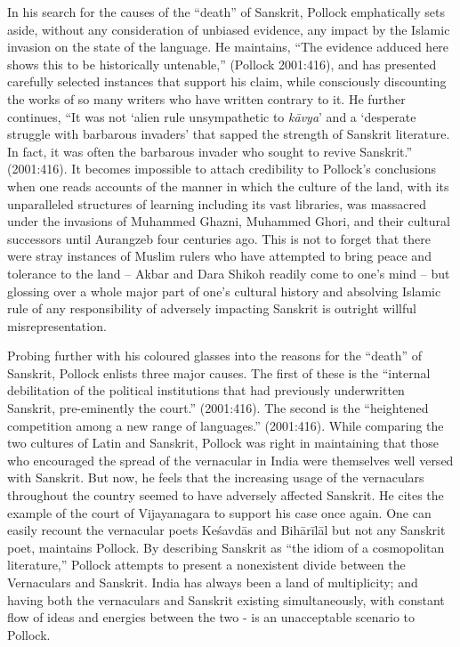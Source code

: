 In his search for the causes of the “death” of Sanskrit, Pollock emphatically sets aside, without any consideration of unbiased evidence, any impact by the Islamic invasion on the state of the language. He maintains, “The evidence adduced here shows this to be historically untenable,” (Pollock 2001:416), and has presented carefully selected instances that support his claim, while consciously discounting the works of so many writers who have written contrary to it. He further continues, “It was not ‘alien rule unsympathetic to {\sl kāvya}’ and a ‘desperate struggle with barbarous invaders’ that sapped the strength of Sanskrit literature. In fact, it was often the barbarous invader who sought to revive Sanskrit.” (2001:416). It becomes impossible to attach credibility to Pollock’s conclusions when one reads accounts of the manner in which the culture of the land, with its unparalleled structures of learning including its vast libraries, was massacred under the invasions of Muhammed Ghazni, Muhammed Ghori, and their cultural successors until Aurangzeb four centuries ago. This is not to forget that there were stray instances of Muslim rulers who have attempted to bring peace and tolerance to the land – Akbar and Dara Shikoh readily come to one’s mind – but glossing over a whole major part of one’s cultural history and absolving Islamic rule of any responsibility of adversely impacting Sanskrit is outright willful misrepresentation.

Probing further with his coloured glasses into the reasons for the “death” of Sanskrit, Pollock enlists three major causes. The first of these is the “internal debilitation of the political institutions that had previously underwritten Sanskrit, pre-eminently the court.” (2001:416). The second is the “heightened competition among a new range of languages.” (2001:416). While comparing the two cultures of Latin and Sanskrit, Pollock was right in maintaining that those who encouraged the spread of the vernacular in India were themselves well versed with Sanskrit. But now, he feels that the increasing usage of the vernaculars throughout the country seemed to have adversely affected Sanskrit. He cites the example of the court of Vijayanagara to support his case once again. One can easily recount the vernacular poets Keśavdās and Bihārīlāl but not any Sanskrit poet, maintains Pollock. By describing Sanskrit as “the idiom of a cosmopolitan literature,” Pollock attempts to present a nonexistent divide between the Vernaculars and Sanskrit. India has always been a land of multiplicity; and having both the vernaculars and Sanskrit existing simultaneously, with constant flow of ideas and energies between the two - is an unacceptable scenario to Pollock. 

